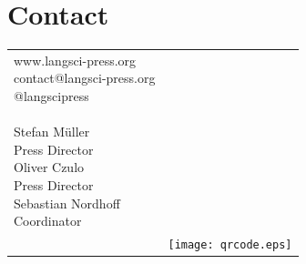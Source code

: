 \documentclass[
notumble,
nofoldmark,
]{leaflet}
\begin{document}
\section{\sffamily\Large\bfseries Contact}  

\setlength{\tabcolsep}{0pt}
\begin{tabular}{ll}
 
\parbox{.64\textwidth}{www.langsci-press.org\\
contact@langsci-press.org\\
@langscipress \\
\\
Stefan Müller 
{\\\scriptsize Press Director}
\\
Oliver Czulo
{\\\scriptsize Press Director}\\
Sebastian Nordhoff  
{\\\scriptsize Coordinator}
}&
\\%
&
\parbox[b][0cm][b]{0cm}{
\texttt{[image: qrcode.eps]}  
}
\end{tabular}

 







% 

 

\loggingall
\end{document}
